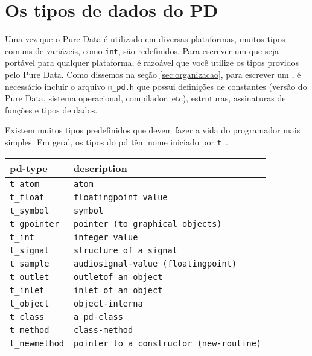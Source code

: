 
\chapter{Os tipos de dados do PD}

Uma vez que o Pure Data é utilizado em diversas plataformas, muitos tipos
comuns de variáveis, como \texttt{int}, são redefinidos. Para escrever um
\external que seja portável para qualquer plataforma, é razoável que você
utilize os tipos providos pelo Pure Data. Como dissemos na seção
\ref{sec:organizacao}, para escrever um \external, é necessário incluir o
arquivo \texttt{m\_pd.h} que possui definições de constantes (versão do Pure
Data, sistema operacional, compilador, etc), estruturas, assinaturas de
funções e tipos de dados.

Existem muitos tipos predefinidos que devem fazer a vida do programador mais
simples. Em geral, os tipos do pd têm nome iniciado por \texttt{t\_}.

\begin{center}
\begin{tabular}{|l|l|}
\hline
pd-type & description \\
\hline
\texttt{t\_atom} & \texttt{atom} \\
\texttt{t\_float} & \texttt{floatingpoint value} \\
\texttt{t\_symbol} & \texttt{symbol} \\
\texttt{t\_gpointer} & \texttt{pointer (to graphical objects)} \\
\texttt{t\_int} & \texttt{integer value} \\
\texttt{t\_signal} & \texttt{structure of a signal} \\
\texttt{t\_sample} & \texttt{audiosignal-value (floatingpoint)} \\
\texttt{t\_outlet} & \texttt{outletof an object} \\
\texttt{t\_inlet} & \texttt{inlet of an object} \\
\texttt{t\_object} & \texttt{object-interna} \\
\texttt{t\_class} & \texttt{a pd-class} \\
\texttt{t\_method} & \texttt{class-method} \\
\texttt{t\_newmethod} & \texttt{pointer to a constructor (new-routine)} \\
\hline
\end{tabular}
\end{center}

